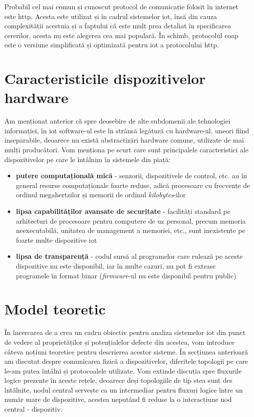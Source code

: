 Probabil cel mai comun și cunoscut protocol de comunicație folosit în internet este \acrfull{http}. Acesta este utilizat și în cadrul sistemelor \acrshort{iot}, însă din cauza complexității acestuia și a faptului că este mult prea detaliat în specificarea cererilor, acesta nu este alegerea cea mai populară. În schimb, protocolul \acrfull{coap} este o versiune simplificată și optimizată pentru \acrshort{iot} a protocolului \acrshort{http}.

\section{Caracteristicile dispozitivelor hardware}

Am menționat anterior că spre deosebire de alte subdomenii ale tehnologiei informației, în \acrshort{iot} software-ul este în strânsă legătură cu hardware-ul, uneori fiind inseparabile, deoarece nu există abstractizări hardware comune, utilizate de mai mulți producători. Vom menționa pe scurt care sunt principalele caracteristici ale dispozitivelor pe care le întâlnim în sistemele din piață:

\begin{itemize}
    \item \textbf{putere computațională mică} - senzorii, dispozitivele de control, etc. au în general resurse computaționale foarte reduse, adică procesoare cu frecvențe de ordinul megahertzilor și memorii de ordinul \textit{kilobytes}-ilor
    \item \textbf{lipsa capabilităților avansate de securitate} - facilități standard pe arhitecturi de procesoare pentru computere de uz personal, precum memoria neexecutabilă, unitatea de management a memoriei, etc., sunt inexistente pe foarte multe dispozitive \acrshort{iot}
    \item \textbf{lipsa de transparență} - codul sursă al programelor care rulează pe aceste dispozitive nu este disponibil, iar în multe cazuri, nu pot fi extrase programele în format binar (\textit{firmware}-ul nu este disponibil pentru public)
\end{itemize}

\section{Model teoretic}

În încercarea de a crea un cadru obiectiv pentru analiza sistemelor \acrshort{iot} din punct de vedere al proprietăților și potențialelor defecte din acestea, vom introduce câteva noțiuni teoretice pentru descrierea acestor sisteme. În secțiunea anterioară am discutat despre comunicarea fizică a dispozitivelor, diferitele topologii pe care le-am putea întâlni și protocoalele utilizate. Vom extinde discuția spre fluxurile logice prezente în aceste rețele, deoarece deși topologiile de tip stea sunt des întâlnite, nodul central servește ca un intermediar pentru fluxuri logice între un număr mare de dispozitive, acestea neputând fi reduse la o interacțiune nod central - dispozitiv.

